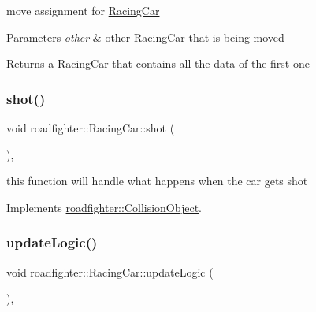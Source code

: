 move assignment for \hyperlink{classroadfighter_1_1RacingCar}{Racing\+Car} 
\begin{DoxyParams}{Parameters}
{\em other} & other \hyperlink{classroadfighter_1_1RacingCar}{Racing\+Car} that is being moved \\
\hline
\end{DoxyParams}
\begin{DoxyReturn}{Returns}
a \hyperlink{classroadfighter_1_1RacingCar}{Racing\+Car} that contains all the data of the first one 
\end{DoxyReturn}
\mbox{\label{classroadfighter_1_1RacingCar_a20c4363a1d31cc17d7d82c8f9a219d2d}} 
\subsubsection{\texorpdfstring{shot()}{shot()}}
{\footnotesize\ttfamily void roadfighter\+::\+Racing\+Car\+::shot (\begin{DoxyParamCaption}{ }\end{DoxyParamCaption})\hspace{0.3cm}{\ttfamily [override]}, {\ttfamily [virtual]}}

this function will handle what happens when the car gets shot 

Implements \hyperlink{classroadfighter_1_1CollisionObject_a338a1071e6d5e25439e57c8673308dbb}{roadfighter\+::\+Collision\+Object}.

\mbox{\label{classroadfighter_1_1RacingCar_af3f3b4c368ba61c13dc9b99004895c5d}} 
\subsubsection{\texorpdfstring{update\+Logic()}{updateLogic()}}
{\footnotesize\ttfamily void roadfighter\+::\+Racing\+Car\+::update\+Logic (\begin{DoxyParamCaption}{ }\end{DoxyParamCaption})\hspace{0.3cm}{\ttfamily [override]}, {\ttfamily [virtual]}}

